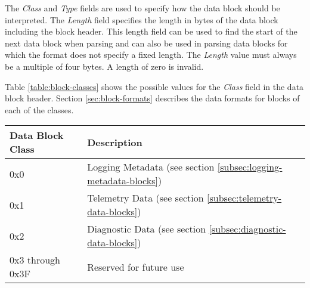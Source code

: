 The \emph{Class} and \emph{Type} fields are used to specify how the data block
should be interpreted. The \emph{Length} field specifies the length in bytes of
the data block including the block header. This length field can be used to find
the start of the next data block when parsing and can also be used in parsing
data blocks for which the format does not specify a fixed length. The
\emph{Length} value must always be a multiple of four bytes. A length of zero is
invalid.

Table \ref{table:block-classes} shows the possible values for the \emph{Class}
field in the data block header. Section \ref{sec:block-formats} describes the
data formats for blocks of each of the classes.

\begin{table*}[htb]
\centering
\begin{tabular}{@{}ll@{}}
\toprule
Data Block Class    &   Description \\
\midrule
0x0                 &   Logging Metadata (see section \ref{subsec:logging-metadata-blocks}) \\
0x1                 &   Telemetry Data (see section \ref{subsec:telemetry-data-blocks})\\
0x2                 &   Diagnostic Data (see section \ref{subsec:diagnostic-data-blocks}) \\
0x3 through 0x3F    &   Reserved for future use \\
\bottomrule
\end{tabular}
\caption{Data Block Classes}
\label{table:block-classes}
\end{table*}

